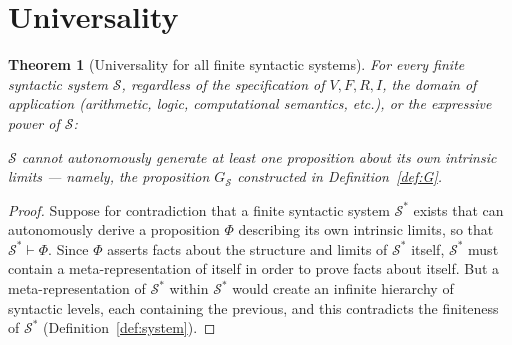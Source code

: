 \documentclass[11pt]{article}
\newtheorem{theorem}{Theorem}[section]
\begin{document}
\section{Universality}
\label{sec:universality}


\begin{theorem}[Universality for all finite syntactic systems]
\label{thm:universality}
For every finite syntactic system $\mathcal{S}$, regardless of the
specification of $V, F, R, I$, the domain of application (arithmetic,
logic, computational semantics, etc.), or the expressive power of
$\mathcal{S}$:

$\mathcal{S}$ cannot autonomously generate at least one proposition
about its own intrinsic limits --- namely, the proposition
$G_{\mathcal{S}}$ constructed in Definition~\ref{def:G}.
\end{theorem}

\begin{proof}
Suppose for contradiction that a finite syntactic system $\mathcal{S}^*$
exists that can autonomously derive a proposition $\Phi$ describing its
own intrinsic limits, so that $\mathcal{S}^* \vdash \Phi$. Since $\Phi$
asserts facts about the structure and limits of $\mathcal{S}^*$ itself,
$\mathcal{S}^*$ must contain a meta-representation of itself in order to
prove facts about itself. But a meta-representation of $\mathcal{S}^*$
within $\mathcal{S}^*$ would create an infinite hierarchy of syntactic
levels, each containing the previous, and this contradicts the finiteness
of $\mathcal{S}^*$ (Definition~\ref{def:system}).
\end{proof}
\end{document}
